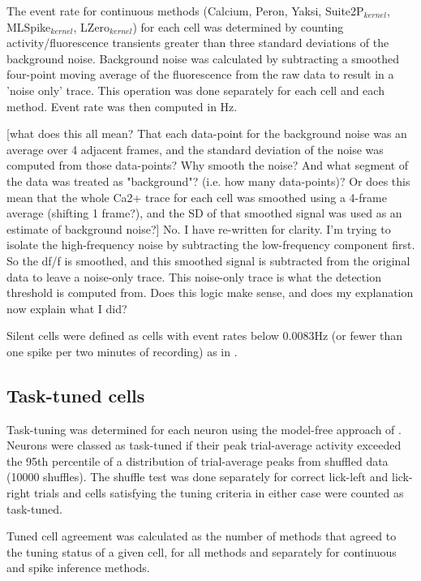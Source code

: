 \documentclass[a4paper,11pt]{article}
\begin{document}
The event rate for continuous methods (Calcium, Peron, Yaksi, Suite2P$_{kernel}$, MLSpike$_{kernel}$, LZero$_{kernel}$) for each cell was determined by counting activity/fluorescence transients greater than three standard deviations of the background noise. Background noise was calculated by subtracting a smoothed four-point moving average of the fluorescence from the raw data to result in a 'noise only' trace. This operation was done separately for each cell and each method. Event rate was then computed in Hz. 

[what does this all mean? That each data-point for the background noise was an average over 4 adjacent frames, and the standard deviation of the noise was computed from those data-points? Why smooth the noise? And what segment of the data was treated as "background"? (i.e. how many data-points)? Or does this mean that the whole Ca2+ trace for each cell was smoothed using a 4-frame average (shifting 1 frame?), and the SD of that smoothed signal was used as an estimate of background noise?] {\color{red} No. I have re-written for clarity. I'm trying to isolate the high-frequency noise by subtracting the low-frequency component first. So the df/f is smoothed, and this smoothed signal is subtracted from the original data to leave a noise-only trace. This noise-only trace is what the detection threshold is computed from. Does this logic make sense, and does my explanation now explain what I did?}

Silent cells were defined as cells with event rates below 0.0083Hz (or fewer than one spike per two minutes of recording) as in \cite{OConnor2010-hd}.

\subsection{Task-tuned cells}
Task-tuning was determined for each neuron using the model-free approach of \cite{Peron2015-kd}. Neurons were classed as task-tuned if their peak trial-average activity exceeded the 95th percentile of a distribution of trial-average peaks from shuffled data (10000 shuffles). The shuffle test was done separately for correct lick-left and lick-right trials and cells satisfying the tuning criteria in either case were counted as task-tuned.

Tuned cell agreement was calculated as the number of methods that agreed to the tuning status of a given cell, for all methods and separately for continuous and spike inference methods.
\end{document}
